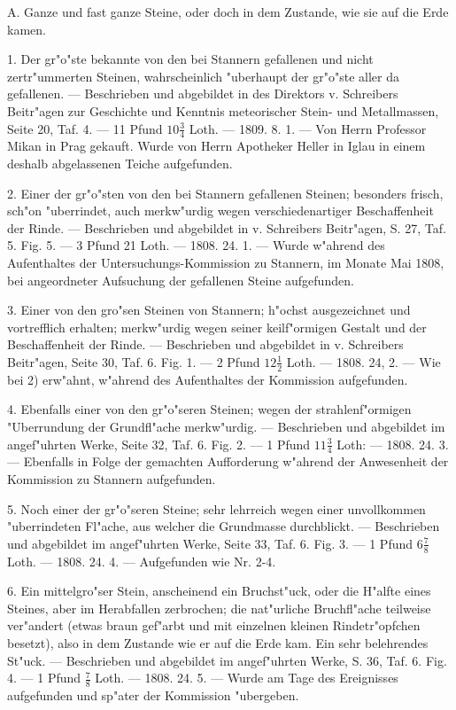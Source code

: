 \documentclass[a4paper, 11pt, oneside, polutonikogreek, german]{article}
\begin{document}
A. Ganze und fast ganze Steine, oder doch in dem Zustande, wie sie auf die Erde kamen.

1. Der gr"o"ste bekannte von den bei Stannern gefallenen und nicht zertr"ummerten Steinen, wahrscheinlich "uberhaupt der gr"o"ste aller da gefallenen. --- Beschrieben und abgebildet in des Direktors v. Schreibers Beitr"agen zur Geschichte und Kenntnis meteorischer Stein- und Metallmassen, Seite 20, Taf. 4. --- 11 Pfund $10\frac{3}{4}$ Loth. --- 1809. 8. 1. --- Von Herrn Professor Mikan in Prag gekauft. Wurde von Herrn Apotheker Heller in Iglau in einem deshalb abgelassenen Teiche aufgefunden.

2. Einer der gr"o"sten von den bei Stannern gefallenen Steinen; besonders frisch, sch"on "uberrindet, auch merkw"urdig wegen verschiedenartiger Beschaffenheit der Rinde. --- Beschrieben und abgebildet in v. Schreibers Beitr"agen, S. 27, Taf. 5. Fig. 5. --- 3 Pfund 21 Loth. --- 1808. 24. 1. --- Wurde w"ahrend des Aufenthaltes der Untersuchungs-Kommission zu Stannern, im Monate Mai 1808, bei angeordneter Aufsuchung der gefallenen Steine aufgefunden.

3. Einer von den gro"sen Steinen von Stannern; h"ochst ausgezeichnet und vortrefflich erhalten; merkw"urdig wegen seiner keilf"ormigen Gestalt und der Beschaffenheit der Rinde. --- Beschrieben und abgebildet in v. Schreibers Beitr"agen, Seite 30, Taf. 6. Fig. 1. --- 2 Pfund $12\frac{1}{2}$ Loth. --- 1808. 24, 2. --- Wie bei 2) erw"ahnt, w"ahrend des Aufenthaltes der Kommission aufgefunden.

4. Ebenfalls einer von den gr"o"seren Steinen; wegen der strahlenf"ormigen "Uberrundung der Grundfl"ache merkw"urdig. --- Beschrieben und abgebildet im angef"uhrten Werke, Seite 32, Taf. 6. Fig. 2. --- 1 Pfund $11\frac{3}{4}$ Loth: --- 1808. 24. 3. --- Ebenfalls in Folge der gemachten Aufforderung w"ahrend der Anwesenheit der Kommission zu Stannern aufgefunden.

5. Noch einer der gr"o"seren Steine; sehr lehrreich wegen einer unvollkommen "uberrindeten Fl"ache, aus welcher die Grundmasse durchblickt. --- Beschrieben und abgebildet im angef"uhrten Werke, Seite 33, Taf. 6. Fig. 3. --- 1 Pfund $6\frac{7}{8}$ Loth. --- 1808. 24. 4. --- Aufgefunden wie Nr. 2-4.

6. Ein mittelgro"ser Stein, anscheinend ein Bruchst"uck, oder die H"alfte eines Steines, aber im Herabfallen zerbrochen; die nat"urliche Bruchfl"ache teilweise ver"andert (etwas braun gef"arbt und mit einzelnen kleinen Rindetr"opfchen besetzt), also in dem Zustande wie er auf die Erde kam. Ein sehr belehrendes St"uck. --- Beschrieben und abgebildet im angef"uhrten Werke, S. 36, Taf. 6. Fig. 4. --- 1 Pfund $\frac{7}{8}$ Loth. --- 1808. 24. 5. --- Wurde am Tage des Ereignisses aufgefunden und sp"ater der Kommission "ubergeben.
\end{document}
